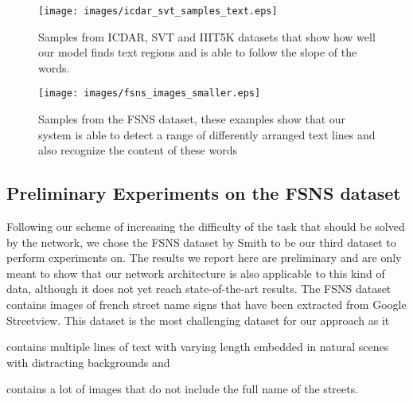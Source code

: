 \documentclass[10pt,twocolumn,letterpaper]{article}
\begin{document}
\begin{figure}[t]
	\begin{center}
		\texttt{[image: images/icdar\_svt\_samples\_text.eps]}
	\end{center}
	\caption{Samples from ICDAR, SVT and IIIT5K datasets that show how well our model finds text regions and is able to follow the slope of the words.}
	\label{fig:robust_reading_text_localization}
\end{figure}

\begin{figure*}[t]
	\begin{center}
		\texttt{[image: images/fsns\_images\_smaller.eps]}
	\end{center}
	\caption{Samples from the \ac{FSNS} dataset, these examples show that our system is able to detect a range of differently arranged text lines and also recognize the content of these words}
	\label{fig:fsns_examples}
\end{figure*}

\subsection{Preliminary Experiments on the \ac{FSNS} dataset}
\label{ssec:fsns_experiments}

Following our scheme of increasing the difficulty of the task that should be solved by the network, we chose the \acf{FSNS} dataset by Smith \etal \cite{Smith2016EndToEnd} to be our third dataset to perform experiments on.
The results we report here are preliminary and are only meant to show that our network architecture is also applicable to this kind of data, although it does not yet reach state-of-the-art results.
The \ac{FSNS} dataset contains images of french street name signs that have been extracted from Google Streetview.
This dataset is the most challenging dataset for our approach as it 
\begin{enumerate*}[label={(\arabic*)}]
	\item contains multiple lines of text with varying length embedded in natural scenes with distracting backgrounds and
	\item contains a lot of images that do not include the full name of the streets.
\end{enumerate*}
\end{document}
